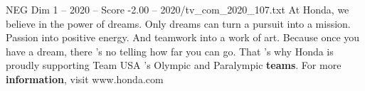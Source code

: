 \begin{textsample}{NEG Dim 1 – 2020 – Score -2.00 – 2020/tv\_com\_2020\_107.txt}  \label{ex:f1_neg_004}
At Honda, we believe in the power of dreams.
Only dreams can turn a pursuit into a mission.
Passion into positive energy.
And teamwork into a work of art.
Because once you have a dream, there 's no telling how far you can go.
That 's why Honda is proudly supporting Team USA 's Olympic and Paralympic \textbf{teams}.
For more \textbf{information}, visit www.honda.com

\end{textsample}
